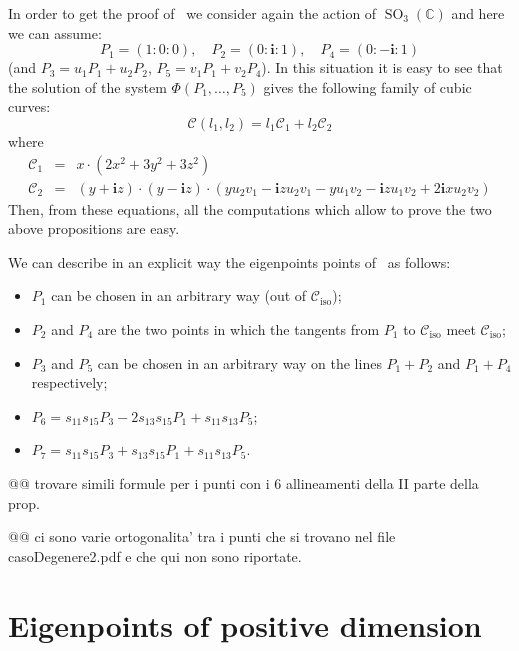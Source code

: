 \documentclass[11pt, a4paper, reqno, captions=tableheading,bibliography=totoc]{scrartcl}
\theoremstyle{plain}
\theoremstyle{definition}
\newcommand{\C}{\mathbb{C}}
\newcommand{\iso}{\mathcal{C}_{\mathrm{iso}}}
\newcommand{\SO}{\operatorname{SO}}
\newcommand{\iii}{\textbf{i}}
\begin{document}
In order to get the proof of~
we consider again the action of $\SO_3(\C)$ and here we can assume:
\[
P_1 = (1: 0: 0), \quad P_2 = (0: \iii: 1), \quad P_4 = (0: -\iii: 1)
\]
(and $P_3 = u_1P_1+u_2P_2$, $P_5 = v_1P_1+v_2P_4$). In this situation it
is easy to see that the solution of the system $\Phi(P_1, \dots, P_5)$
gives the following family of cubic curves:
\[
\mathcal{C}(l_1, l_2) = l_1\mathcal{C}_1+l_2\mathcal{C}_2
\]
where
\begin{eqnarray}
  \mathcal{C}_1 & = & x \cdot \left(2x^{2} + 3 y^{2} + 3 z^{2}\right)\\
  \mathcal{C}_2 & = & (y + \iii z) \cdot (y - \iii z)
\cdot (y u_{2} v_{1} - \iii z u_{2} v_{1} - y u_{1} v_{2} - 
\iii z u_{1} v_{2} + 2 \iii x u_{2} v_{2})  \nonumber
\label{famigliaCubDim1}
\end{eqnarray}
Then, from these equations, all the computations which allow to prove
the two above propositions are easy.

We can describe in an explicit way the eigenpoints points
of~ as follows:
\begin{itemize}
\item $P_1$ can be chosen in an arbitrary way (out of $\iso$);
\item $P_2$ and $P_4$ are the two points in which the
tangents from $P_1$ to $\iso$ meet $\iso$;
\item $P_3$ and $P_5$ can be chosen in an arbitrary way on the lines
$P_1+P_2$ and $P_1+P_4$ respectively;
\item $P_6 = s_{11}s_{15}P_3-2s_{13}s_{15}P_1 + s_{11}s_{13}P_5$;
\item $P_7 = s_{11}s_{15}P_3+s_{13}s_{15}P_1 + s_{11}s_{13}P_5$.
\end{itemize}
@@ trovare simili formule per i punti con i 6 allineamenti della
II parte della prop.

@@ ci sono varie ortogonalita' tra i punti che si trovano nel file
casoDegenere2.pdf e che qui non sono riportate.

\section{Eigenpoints of positive dimension}
\end{document}
